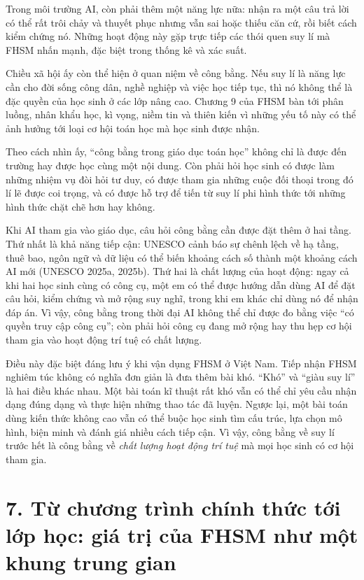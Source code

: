 Trong môi trường AI, còn phải thêm một năng lực nữa: nhận ra một câu trả lời có thể rất trôi chảy và thuyết phục nhưng vẫn sai hoặc thiếu căn cứ, rồi biết cách kiểm chứng nó. Những hoạt động này gặp trực tiếp các thói quen suy lí mà FHSM nhấn mạnh, đặc biệt trong thống kê và xác suất.

Chiều xã hội ấy còn thể hiện ở quan niệm về công bằng. Nếu suy lí là năng lực cần cho đời sống công dân, nghề nghiệp và việc học tiếp tục, thì nó không thể là đặc quyền của học sinh ở các lớp nâng cao. Chương 9 của FHSM bàn tới phân luồng, nhân khẩu học, kì vọng, niềm tin và thiên kiến vì những yếu tố này có thể ảnh hưởng tới loại cơ hội toán học mà học sinh được nhận.

Theo cách nhìn ấy, ``công bằng trong giáo dục toán học'' không chỉ là được đến trường hay được học cùng một nội dung. Còn phải hỏi học sinh có được làm những nhiệm vụ đòi hỏi tư duy, có được tham gia những cuộc đối thoại trong đó lí lẽ được coi trọng, và có được hỗ trợ để tiến từ suy lí phi hình thức tới những hình thức chặt chẽ hơn hay không.

Khi AI tham gia vào giáo dục, câu hỏi công bằng cần được đặt thêm ở hai tầng. Thứ nhất là khả năng tiếp cận: UNESCO cảnh báo sự chênh lệch về hạ tầng, thuê bao, ngôn ngữ và dữ liệu có thể biến khoảng cách số thành một khoảng cách AI mới (UNESCO 2025a, 2025b). Thứ hai là chất lượng của hoạt động: ngay cả khi hai học sinh cùng có công cụ, một em có thể được hướng dẫn dùng AI để đặt câu hỏi, kiểm chứng và mở rộng suy nghĩ, trong khi em khác chỉ dùng nó để nhận đáp án. Vì vậy, công bằng trong thời đại AI không thể chỉ được đo bằng việc ``có quyền truy cập công cụ''; còn phải hỏi công cụ đang mở rộng hay thu hẹp cơ hội tham gia vào hoạt động trí tuệ có chất lượng.

Điều này đặc biệt đáng lưu ý khi vận dụng FHSM ở Việt Nam. Tiếp nhận FHSM nghiêm túc không có nghĩa đơn giản là đưa thêm bài khó. ``Khó'' và ``giàu suy lí'' là hai điều khác nhau. Một bài toán kĩ thuật rất khó vẫn có thể chỉ yêu cầu nhận dạng đúng dạng và thực hiện những thao tác đã luyện. Ngược lại, một bài toán dùng kiến thức không cao vẫn có thể buộc học sinh tìm cấu trúc, lựa chọn mô hình, biện minh và đánh giá nhiều cách tiếp cận. Vì vậy, công bằng về suy lí trước hết là công bằng về \emph{chất lượng hoạt động trí tuệ} mà mọi học sinh có cơ hội tham gia.

{}
\section*{7. Từ chương trình chính thức tới lớp học: giá trị của FHSM như một khung trung gian}

